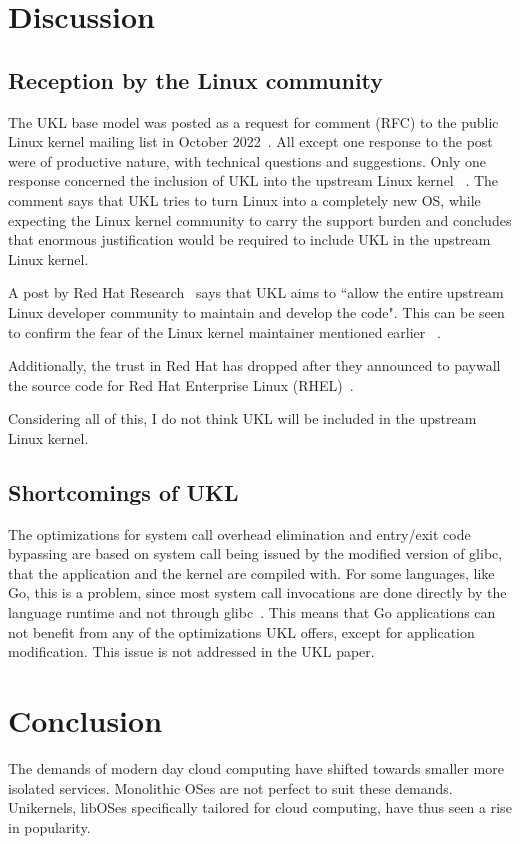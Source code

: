 \documentclass[10pt,twocolumn,a4paper]{article}
\begin{document}
\section{Discussion}\label{sec:discussion}
  \subsection{Reception by the Linux community}
    The UKL base model was posted as a request for comment (RFC) to the public Linux
    kernel mailing list in October 2022~\cite{ukl-rfc-lwn}.
    All except one response to the post were of productive nature, with technical questions
    and suggestions. 
    Only one response concerned the inclusion of UKL into the upstream Linux kernel 
   ~\cite{ukl-rfc-negative}.
    The comment says that UKL tries to turn Linux into a completely new OS, while expecting 
    the Linux kernel community to carry the support burden and concludes that enormous
    justification would be required to include UKL in the upstream Linux kernel.

    A post by Red Hat Research~\cite{ukl-redhat-post} says that UKL aims to ``allow 
    the entire upstream Linux developer community to maintain and develop the code".
    This can be seen to confirm the fear of the Linux kernel maintainer mentioned earlier
   ~\cite{ukl-rfc-negative}.

    Additionally, the trust in Red Hat has dropped after they announced to paywall the
    source code for Red Hat Enterprise Linux (RHEL)~\cite{redhat-fuckup}.

    Considering all of this, I do not think UKL will be included in the upstream
    Linux kernel.

  \subsection{Shortcomings of UKL}
    The optimizations for system call overhead elimination and entry/exit code bypassing
    are based on system call being issued by the modified version of glibc, that
    the application and the kernel are compiled with.
    For some languages, like Go, this is a problem, since most system call invocations
    are done directly by the language runtime and not through glibc~\cite{ukl-vs-unicraft}.
    This means that Go applications can not benefit from any of the optimizations UKL offers,
    except for application modification.
    This issue is not addressed in the UKL paper.

\section{Conclusion}
  The demands of modern day cloud computing have shifted towards smaller more isolated services.
  Monolithic OSes are not perfect to suit these demands.
  Unikernels, libOSes specifically tailored for cloud computing, have thus seen a rise in popularity.
\end{document}
